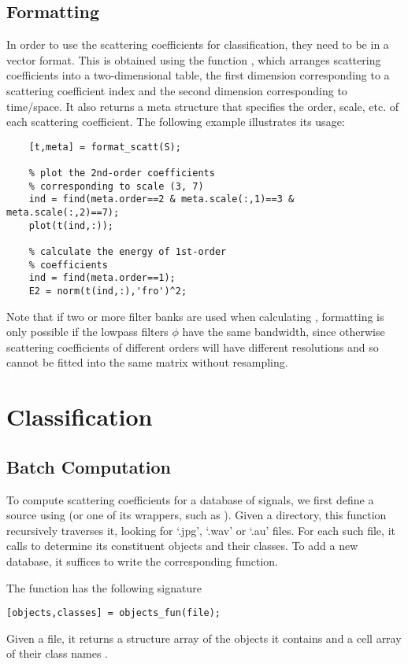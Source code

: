 \documentclass[twocolumn]{article}
\begin{document}
\subsection{Formatting}
In order to use the scattering coefficients for classification, they need to be in a vector format. This is obtained using the function , which arranges scattering coefficients into a two-dimensional table, the first dimension corresponding to a scattering coefficient index and the second dimension corresponding to time/space. It also returns a meta structure that specifies the order, scale, etc. of each scattering coefficient. The following example illustrates its usage:
\begin{lstlisting}
	[t,meta] = format_scatt(S);
	
	% plot the 2nd-order coefficients
	% corresponding to scale (3, 7)
	ind = find(meta.order==2 & meta.scale(:,1)==3 & meta.scale(:,2)==7);
	plot(t(ind,:));
	
	% calculate the energy of 1st-order
	% coefficients
	ind = find(meta.order==1);
	E2 = norm(t(ind,:),'fro')^2;
\end{lstlisting}

Note that if two or more filter banks are used when calculating , formatting is only possible if the lowpass filters $\phi$ have the same bandwidth, since otherwise scattering coefficients of different orders will have different resolutions and so cannot be fitted into the same matrix without resampling.

\section{Classification}

\subsection{Batch Computation}

To compute scattering coefficients for a database of signals, we first define a source using  (or one of its wrappers, such as ). Given a directory, this function recursively traverses it, looking for `.jpg', `.wav' or `.au' files. For each such file, it calls  to determine its constituent objects and their classes. To add a new database, it suffices to write the corresponding  function.

The  function has the following signature
\begin{lstlisting}
[objects,classes] = objects_fun(file);
\end{lstlisting}
Given a file, it returns a structure array  of the objects it contains and a cell array of their class names . 
\end{document}
